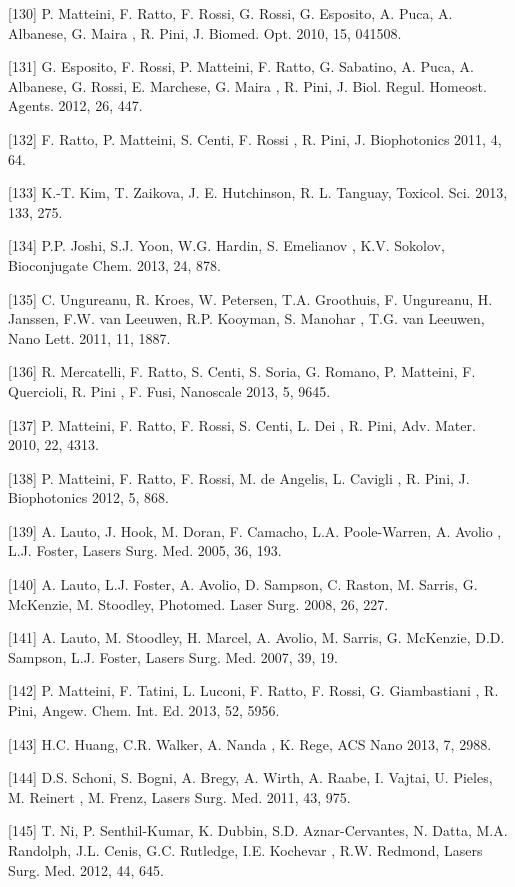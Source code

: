 [130]	P. Matteini, F. Ratto, F. Rossi, G. Rossi, G. Esposito, A. Puca, A. Albanese, G. Maira , R. Pini, J. Biomed. Opt. 2010, 15, 041508.

[131]	G. Esposito, F. Rossi, P. Matteini, F. Ratto, G. Sabatino, A. Puca, A. Albanese, G. Rossi, E. Marchese, G. Maira , R. Pini, J. Biol. Regul. 
Homeost. Agents. 2012, 26, 447.

[132]	F. Ratto, P. Matteini, S. Centi, F. Rossi , R. Pini, J. Biophotonics 2011, 4, 64.

[133]	K.-T. Kim, T. Zaikova, J. E. Hutchinson, R. L. Tanguay, Toxicol. Sci. 2013, 133, 275.

[134]	P.P. Joshi, S.J. Yoon, W.G. Hardin, S. Emelianov , K.V. Sokolov, Bioconjugate Chem. 2013, 24, 878.

[135]	C. Ungureanu, R. Kroes, W. Petersen, T.A. Groothuis, F. Ungureanu, H. Janssen, F.W. van Leeuwen, R.P. Kooyman, S. Manohar , T.G. van Leeuwen, Nano 
Lett. 2011, 11, 1887.

[136]	R. Mercatelli, F. Ratto, S. Centi, S. Soria, G. Romano, P. Matteini, F. Quercioli, R. Pini , F. Fusi, Nanoscale 2013, 5, 9645.

[137]	P. Matteini, F. Ratto, F. Rossi, S. Centi, L. Dei , R. Pini, Adv. Mater. 2010, 22, 4313.

[138]	P. Matteini, F. Ratto, F. Rossi, M. de Angelis, L. Cavigli , R. Pini, J. Biophotonics 2012, 5, 868.

[139]	A. Lauto, J. Hook, M. Doran, F. Camacho, L.A. Poole-Warren, A. Avolio , L.J. Foster, Lasers Surg. Med. 2005, 36, 193.

[140]	A. Lauto, L.J. Foster, A. Avolio, D. Sampson, C. Raston, M. Sarris, G. McKenzie, M. Stoodley, Photomed. Laser Surg. 2008, 26, 227.

[141]	A. Lauto, M. Stoodley, H. Marcel, A. Avolio, M. Sarris, G. McKenzie, D.D. Sampson, L.J. Foster, Lasers Surg. Med. 2007, 39, 19.

[142]	P. Matteini, F. Tatini, L. Luconi, F. Ratto, F. Rossi, G. Giambastiani , R. Pini, Angew. Chem. Int. Ed. 2013, 52, 5956.

[143]	H.C. Huang, C.R. Walker, A. Nanda , K. Rege, ACS Nano 2013, 7, 2988.

[144]	D.S. Schoni, S. Bogni, A. Bregy, A. Wirth, A. Raabe, I. Vajtai, U. Pieles, M. Reinert , M. Frenz, Lasers Surg. Med. 2011, 43, 975.

[145]	T. Ni, P. Senthil-Kumar, K. Dubbin, S.D. Aznar-Cervantes, N. Datta, M.A. Randolph, J.L. Cenis, G.C. Rutledge, I.E. Kochevar , R.W. Redmond, Lasers 
Surg. Med. 2012, 44, 645.

